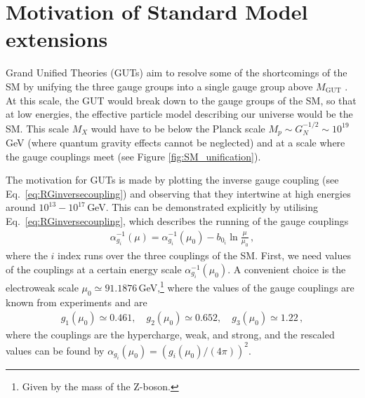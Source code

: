 \section{Motivation of Standard Model extensions}\label{sec:Motiv}
Grand Unified Theories (GUTs) aim to resolve some of the shortcomings of the SM by unifying the three gauge groups into a single gauge group above $M_\mathrm{GUT}$ \cite{Langacker:1994vf}. At this scale, the GUT would break down to the gauge groups of the SM, so that at low energies, the effective particle model describing our universe would be the SM. This scale $M_X$ would have to be below the Planck scale $M_p\sim G_N^{-1/2}\sim10^{19}\,$GeV (where quantum gravity effects cannot be neglected) and at a scale where the gauge couplings meet (see Figure \ref{fig:SM_unification})\cite{Georgi:1974yf}.  

The motivation for GUTs is made by plotting the inverse gauge coupling (see Eq.~\eqref{eq:RGinversecoupling}) and observing that they intertwine at high energies around $10^{13}-10^{17}\,$GeV. This can be demonstrated explicitly by utilising Eq.~\eqref{eq:RGinversecoupling}, which describes the running of the gauge couplings
\begin{align}
    \alpha^{-1}_{g_i}(\mu)=\alpha_{g_i}^{-1}(\mu_0)-b_{0_i}\ln\frac{\mu}{\mu_0}\,,
\end{align}
where the $i$ index runs over the three couplings of the SM. First, we need values of the couplings at a certain energy scale $\alpha_{g_i}^{-1}(\mu_0)$. A convenient choice is the electroweak scale $\mu_0\simeq 91.1876\,$GeV,\footnote{Given by the mass of the Z-boson.} where the values of the gauge couplings are known from experiments \cite{ParticleDataGroup:2024cfk} and are
\begin{align}
    g_1(\mu_0) \simeq 0.461, \quad g_2(\mu_0) \simeq 0.652, \quad g_3(\mu_0) \simeq 1.22\,, \label{eq:electroweakgaugeval}
\end{align}
where the couplings are the hypercharge, weak, and strong, and the rescaled values can be found by $\alpha_{g_i}(\mu_0) =  (g_i(\mu_0)  / (4 \pi))^2$. 


